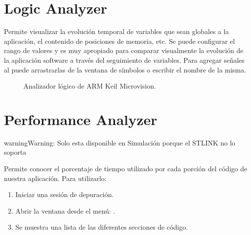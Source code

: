\documentclass[letterpaper,10pt,english]{sphinxmanual}
\begin{document}
\section{Logic Analyzer}
\label{\detokenize{cmsis-rtos:logic-analyzer}}
\sphinxAtStartPar
Permite visualizar la evolución temporal de variables que sean globales a la aplicación, el contenido de posiciones de memoria, etc. Se puede configurar el rango de valores y es muy apropiado para comparar visualmente la evolución de la aplicación software a través del seguimiento de variables.
Para agregar señales al  puede arrastrarlas de la ventana de símbolos o escribir el nombre de la misma.

\begin{figure}[htbp]
\centering
\capstart

\noindent{}
\caption{Analizador lógico de ARM Keil Microvision.}\label{\detokenize{cmsis-rtos:id2}}\end{figure}


\section{Performance Analyzer}
\label{\detokenize{cmsis-rtos:performance-analyzer}}
\begin{sphinxadmonition}{warning}{Warning:}
\sphinxAtStartPar
Solo esta disponible en Simulación porque el ST\sphinxhyphen{}LINK no lo soporta
\end{sphinxadmonition}

\sphinxAtStartPar
Permite conocer el porcentaje de tiempo utilizado por cada porción del código de nuestra aplicación.
Para utilizarlo:
\begin{enumerate}
%
\item {} 
\sphinxAtStartPar
Iniciar una sesión de depuración.

\item {} 
\sphinxAtStartPar
Abrir la ventana desde el menú: .

\item {} 
\sphinxAtStartPar
Se muestra una lista de las diferentes secciones de código.

\end{enumerate}

\begin{figure}[htbp]
\centering

\noindent{}
\end{figure}
\end{document}
